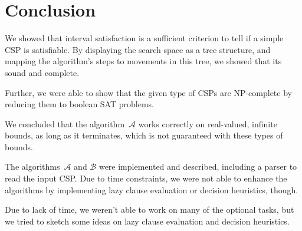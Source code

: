\section{Conclusion}\label{sec:conclusion}

We showed that interval satisfaction is a sufficient criterion to tell if a simple CSP is satisfiable.
By displaying the search space as a tree structure, and mapping the algorithm's steps to movements in this tree, we showed that its sound and complete.

Further, we were able to show that the given type of CSPs are NP-complete by reducing them to boolean SAT problems.

We concluded that the algorithm~$\mathcal{A}$ works correctly on real-valued, infinite bounds, as long as it terminates, which is not guaranteed with these types of bounds.

The algorithms~$\mathcal{A}$ and $\mathcal{B}$ were implemented and described, including a parser to read the input CSP. Due to time constraints, we were not able to enhance the algorithms by implementing lazy clause evaluation or decision heuristics, though.

Due to lack of time, we weren't able to work on many of the optional tasks, but we tried to sketch some ideas on lazy clause evaluation and decision heuristics.
